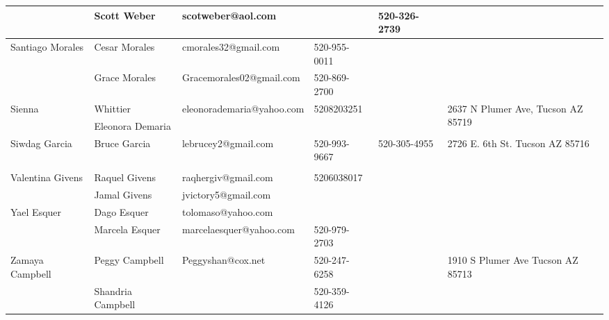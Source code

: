 \documentclass[landscape]{article}\usepackage[]{graphicx}\usepackage[]{color}
\begin{document}
\begin{longtable}{|p{100pt}|p{100pt}|p{140pt}|p{60pt}|p{64pt}|p{120pt}|}
 & Scott Weber & scotweber@aol.com &  & 520-326-2739 & \\
\hline
\multirow{2}{100pt}{Santiago Morales} & Cesar Morales & cmorales32@gmail.com & 520-955-0011 &  & \multirow{2}{120pt}{} \\
 & Grace Morales  & Gracemorales02@gmail.com & 520-869-2700 &  & \\
\hline
\multirow{2}{100pt}{Sienna} & Whittier & eleonorademaria@yahoo.com & 5208203251 &  & \multirow{2}{120pt}{2637 N Plumer Ave, Tucson AZ 85719} \\
 & Eleonora Demaria &  &  &  & \\
\hline
\multirow{2}{100pt}{Siwdag Garcia} & Bruce Garcia & lebrucey2@gmail.com & 520-993-9667 & 520-305-4955 & \multirow{2}{120pt}{2726 E. 6th St. Tucson AZ 85716} \\
 &  &  &  &  & \\
\hline
\multirow{2}{100pt}{Valentina Givens} & Raquel Givens & raqhergiv@gmail.com & 5206038017 &  & \multirow{2}{120pt}{} \\
 & Jamal Givens & jvictory5@gmail.com &  &  & \\
\hline
\multirow{2}{100pt}{Yael Esquer} & Dago Esquer & tolomaso@yahoo.com &  &  & \multirow{2}{120pt}{} \\
 & Marcela Esquer & marcelaesquer@yahoo.com & 520-979-2703 &  & \\
\hline
\multirow{2}{100pt}{Zamaya Campbell} & Peggy Campbell  & Peggyshan@cox.net & 520-247-6258 &  & \multirow{2}{120pt}{1910 S Plumer Ave Tucson AZ 85713} \\
 & Shandria Campbell  &  & 520-359-4126 &  & \\
\hline
\end{longtable}
\newpage
\end{document}
